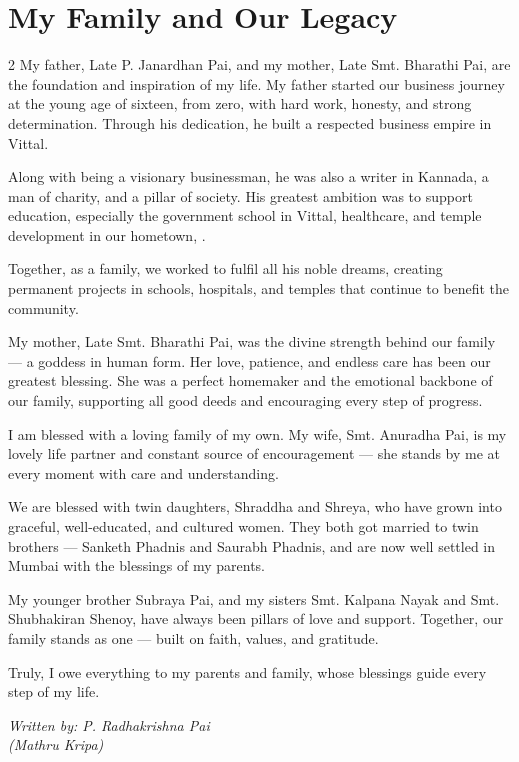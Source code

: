 \documentclass[12pt]{article}
\newcommand{\attribution}[1]{%
  \par\vspace{2em}%
  \begin{flushright}\itshape #1\end{flushright}%
}
\begin{document}
\section*{My Family and Our Legacy}
\begin{multicols}{2}
\noindent My father, Late P. Janardhan Pai, and my mother, Late Smt. Bharathi Pai, are the foundation and inspiration of my life. My father started our business journey at the young age of sixteen, from zero, with hard work, honesty, and strong determination. Through his dedication, he built a respected business empire in Vittal.

Along with being a visionary businessman, he was also a writer in Kannada, a man of charity, and a pillar of society. His greatest ambition was to support education, especially the government school in Vittal, healthcare, and temple development in our hometown, .

Together, as a family, we worked to fulfil all his noble dreams, creating permanent projects in schools, hospitals, and temples that continue to benefit the community.

My mother, Late Smt. Bharathi Pai, was the divine strength behind our family — a goddess in human form. Her love, patience, and endless care has been our greatest blessing. She was a perfect homemaker and the emotional backbone of our family, supporting all good deeds and encouraging every step of progress.

I am blessed with a loving family of my own. My wife, Smt. Anuradha Pai, is my lovely life partner and constant source of encouragement — she stands by me at every moment with care and understanding.

We are blessed with twin daughters, Shraddha and Shreya, who have grown into graceful, well-educated, and cultured women. They both got married to twin brothers — Sanketh Phadnis and Saurabh Phadnis, and are now well settled in Mumbai with the blessings of my parents.

My younger brother Subraya Pai, and my sisters Smt. Kalpana Nayak and Smt. Shubhakiran Shenoy, have always been pillars of love and support. Together, our family stands as one — built on faith, values, and gratitude.

Truly, I owe everything to my parents and family, whose blessings guide every step of my life.

\end{multicols}
\attribution{Written by: P. Radhakrishna Pai\\(Mathru Kripa)}
\newpage
\end{document}
